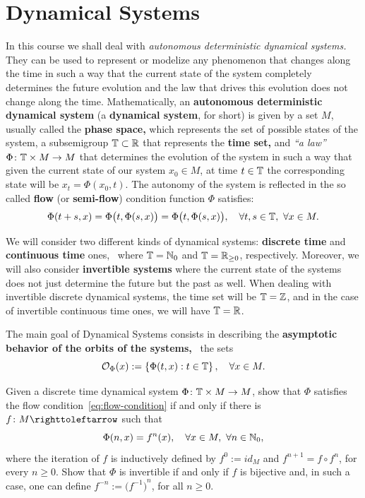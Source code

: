 \section{Dynamical Systems}
\label{sec:dynamical-systems}

In this course we shall deal with \emph{autonomous deterministic dynamical systems.} They can be used to represent or modelize any phenomenon that changes along the time in such a way that the current state of the system completely determines the future evolution and the law that drives this evolution does not change along the time. Mathematically, an \textbf{autonomous deterministic dynamical system} (a \textbf{dynamical system}, for short) is given by a set $M$, usually called the \textbf{phase space,} which represents the set of possible states of the system, a subsemigroup $\mathbb{T}\subset\mathbb{R}$ that represents the \textbf{time set,} and \emph{``a law''} $\Phi\colon\mathbb{T}\times M\to M$ that determines the evolution of the system in such a way that given the current state of our system $x_{0}\in M$, at time $t\in\mathbb{T}$ the corresponding state will be $x_{t}=\Phi(x_{0},t)$. The autonomy of the system is reflected in the so called \textbf{flow} (or \textbf{semi-flow}) condition function $\Phi$ satisfies:
\begin{equation}\label{eq:flow-condition}
  \Phi(t+s,x)=\Phi\big(t,\Phi(s,x)\big) = \Phi\big(t,\Phi(s,x)\big), \quad\forall t,s\in\mathbb{T},\ \forall x\in M.
\end{equation}

We will consider two different kinds of dynamical systems: \textbf{discrete time} and \textbf{continuous time} ones, \ie~where $\mathbb{T}=\mathbb{N}_{0}$ and $\mathbb{T}=\mathbb{R}_{\geq 0}$, respectively. Moreover, we will also consider \textbf{invertible systems} where the current state of the systems does not just determine the future but the past as well. When dealing with invertible discrete dynamical systems, the time set will be $\mathbb{T}=\mathbb{Z}$, and in the case of invertible continuous time ones, we will have $\mathbb{T}=\mathbb{R}$.

The main goal of Dynamical Systems consists in describing the \textbf{asymptotic behavior of the orbits of the systems,} \ie~the sets
\begin{displaymath}
  \mathcal{O}_{\Phi}(x):=\left\{\Phi(t,x) : t\in\mathbb{T}\right\}, \quad\forall x\in M.
\end{displaymath}


\begin{exercise}
  Given a discrete time dynamical system $\Phi\colon\mathbb{T}\times M\to M$, show that $\Phi$ satisfies the flow condition~\eqref{eq:flow-condition} if and only if there is $f\colon M\carr$ such that
  \begin{displaymath}
    \Phi(n,x)=f^{n}(x), \quad\forall x\in M,\ \forall n\in\N_{0},
  \end{displaymath}
  where the iteration of $f$ is inductively defined by $f^{0}:=id_{M}$ and $f^{n+1}=f\circ f^{n}$, for every $n\geq 0$. Show that $\Phi$ is invertible if and only if $f$ is bijective and, in such a case, one can define $f^{-n}:={\big(f^{-1}\big)}^{n}$, for all $n\geq 0$.
\end{exercise}

